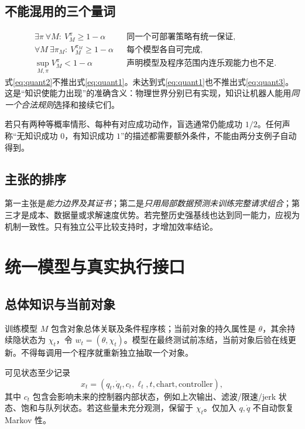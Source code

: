 \documentclass[11pt,a4paper,fontset=fandol]{ctexart}
\theoremstyle{definition}
\theoremstyle{remark}\newtheorem{remark}[theorem]{说明}
\numberwithin{equation}{section}
\begin{document}
\subsection{不能混用的三个量词}
\begin{align}
 &\exists\pi\ \forall M:\ V_M^\pi\ge1-\alpha
 &&\text{同一个可部署策略有统一保证},\label{eq:quant1}\\
 &\forall M\ \exists\pi_M:\ V_M^{\pi_M}\ge1-\alpha
 &&\text{每个模型各自可完成},\label{eq:quant2}\\
 &\sup_{M,\pi}V_M^\pi<1-\alpha
 &&\text{声明模型及程序范围内连乐观能力也不足}.\label{eq:quant3}
\end{align}
式\eqref{eq:quant2}不推出式\eqref{eq:quant1}。未达到式\eqref{eq:quant1}也不推出式\eqref{eq:quant3}。这是“知识使能力出现”的准确含义：物理世界分别已有实现，知识让机器人能用\emph{同一个合法规则}选择和接续它们。

若只有两种等概率情形、每种有对应成功动作，盲选通常仍能成功 $1/2$。任何声称“无知识成功 $0$，有知识成功 $1$”的描述都需要额外条件，不能由两分支例子自动得到。

\subsection{主张的排序}
第一主张是\emph{能力边界及其证书}；第二是\emph{只用局部数据预测未训练完整请求组合}；第三才是成本、数据量或求解速度优势。若完整历史强基线也达到同一能力，应视为机制一致性。只有独立公平比较支持时，才增加效率结论。

\section{统一模型与真实执行接口}
\label{sec:model}
\subsection{总体知识与当前对象}
训练模型 $M$ 包含对象总体关联及条件程序核；当前对象的持久属性是 $\theta$，其余持续隐状态为 $\chi_t$，令 $w_t=(\theta,\chi_t)$。模型在最终测试前冻结，当前对象后验在线更新。不得每调用一个程序就重新独立抽取一个对象。

可见状态至少记录
\begin{equation}
 x_t=(q_t,\dot q_t,c_t,\ell_t,t,\mathrm{chart},\mathrm{controller}),
 \label{eq:state}
\end{equation}
其中 $c_t$ 包含会影响未来的控制器内部状态，例如上次输出、滤波/限速/jerk 状态、饱和与队列状态。若这些量未充分观测，保留于 $\chi_t$。仅加入 $q,\dot q$ 不自动恢复 Markov 性。
\end{document}
